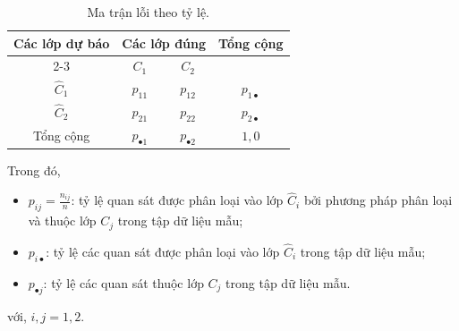\begin{table}[H]
	\centering
	\begin{tabular}{|c|cc|c|}
		\hline
		\multirow{2}{*}{Các lớp dự báo} & \multicolumn{2}{c|}{Các lớp đúng} & \multirow{2}{*}{Tổng cộng} \\ \cline{2-3}
		& $C_1$ & $C_2$ & \\ \hline
		$\hat{C}_1$ & $p_{11}$ & $p_{12}$ & $p_{1\bullet}$ \\
		$\hat{C}_2$ & $p_{21}$ & $p_{22}$ & $p_{2\bullet}$ \\ \hline
		Tổng cộng & $p_{\bullet 1}$ & $p_{\bullet 2}$  & $1,0$ \\ \hline
	\end{tabular}
	\caption{Ma trận lỗi theo tỷ lệ.}
	\label{tab:MaTranLoiTyLe}
\end{table}
Trong đó, 
\begin{itemize}
	\item $p_{ij}=\frac{n_{ij}}{n}$: tỷ lệ quan sát được phân loại vào lớp $\hat{C}_i$ bởi phương pháp phân loại và thuộc lớp $C_j$ trong tập dữ liệu mẫu;
	\item $p_{i\bullet}$: tỷ lệ các quan sát được phân loại vào lớp $\hat{C}_i$ trong tập dữ liệu mẫu;
	\item $p_{\bullet j}$: tỷ lệ các quan sát thuộc lớp $C_j$ trong tập dữ liệu mẫu.
\end{itemize}
với, $i,j=1,2$.
